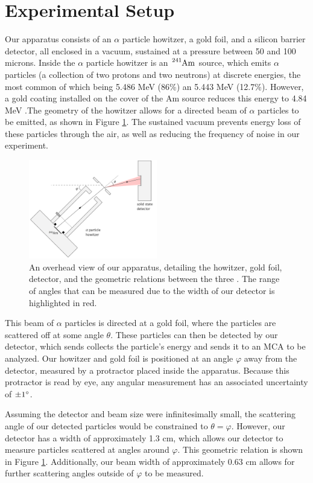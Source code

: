 \section{Experimental Setup}
Our apparatus consists of an $\alpha$ particle howitzer, a gold foil, and a silicon barrier detector, all enclosed in a vacuum, sustained at a pressure between 50 and 100 microns. Inside the $\alpha$ particle howitzer is an $\tensor*[^{241}]{\text{Am}}{}$ source, which emits $\alpha$ particles (a collection of two protons and two neutrons) at discrete energies, the most common of which being 5.486 MeV (86\%) an 5.443 MeV (12.7\%). However, a gold coating installed on the cover of the Am source reduces this energy to 4.84 MeV \cite{sean}.The geometry of the howitzer allows for a directed beam of $\alpha$ particles to be emitted, as shown in Figure \ref{apparatus}. The sustained vacuum prevents energy loss of these particles through the air, as well as reducing the frequency of noise in our experiment.
\begin{figure}[h]
  \includegraphics[width=0.5\textwidth]{apparatus-width1.png}
  \caption{An overhead view of our apparatus, detailing the howitzer, gold foil, detector, and the geometric relations between the three \cite{jlab}. The range of angles that can be measured due to the width of our detector is highlighted in red.}
  \label{apparatus}
\end{figure}
This beam of $\alpha$ particles is directed at a gold foil, where the particles are scattered off at some angle $\theta$. These particles can then be detected by our detector, which sends collects the particle's energy and sends it to an MCA to be analyzed. Our howitzer and gold foil is positioned at an angle $\varphi$ away from the detector, measured by a protractor placed inside the apparatus. Because this protractor is read by eye, any angular measurement has an associated uncertainty of $\pm 1\degree$. 

Assuming the detector and beam size were infinitesimally small, the scattering angle of our detected particles would be constrained to $\theta = \varphi$. However, our detector has a width of approximately 1.3 cm, which allows our detector to measure particles scattered at angles around $\varphi$. This geometric relation is shown in Figure \ref{apparatus}. Additionally, our beam width of approximately 0.63 cm allows for further scattering angles outside of $\varphi$ to be measured.

